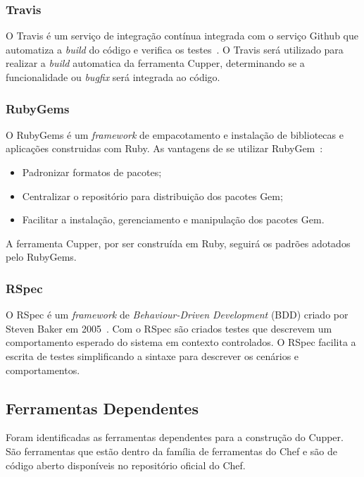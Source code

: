 \subsubsection{Travis}
\label{sec:supdev:travis}

O Travis é um serviço de integração contínua integrada com o serviço Github que automatiza
a \textit{build} do código e verifica os testes~\cite{travis:2016}. O Travis será utilizado para
realizar a \textit{build} automatica da ferramenta Cupper, determinando se a funcionalidade ou \textit{bugfix}
será integrada ao código.

\subsubsection{RubyGems}
\label{sec:supdev:rubygems}

O RubyGems é um \textit{framework} de empacotamento e instalação de bibliotecas e aplicações
construidas com Ruby. As vantagens de se utilizar RubyGem~\cite{thomas:2001}:

\begin{itemize}
 \item Padronizar formatos de pacotes;
 \item Centralizar o repositório para distribuição dos pacotes Gem;
 \item Facilitar a instalação, gerenciamento e manipulação dos pacotes Gem.
\end{itemize}

A ferramenta Cupper, por ser construída em Ruby, seguirá os padrões adotados
pelo RubyGems.

\subsubsection{RSpec}
\label{sec:supdev:rspec}

O RSpec é um \textit{framework} de \textit{Behaviour-Driven Development} (BDD)
criado por Steven Baker em 2005~\cite{chelimsky:2010}. Com o RSpec
são criados testes que descrevem um comportamento esperado do sistema
em contexto controlados. O RSpec facilita a escrita de testes simplificando
a sintaxe para descrever os cenários e comportamentos.

\subsection{Ferramentas Dependentes}
\label{sec:deps}

Foram identificadas as ferramentas dependentes para a construção do Cupper.
São ferramentas que estão dentro da família de ferramentas do Chef e são
de código aberto disponíveis no repositório oficial do Chef.

